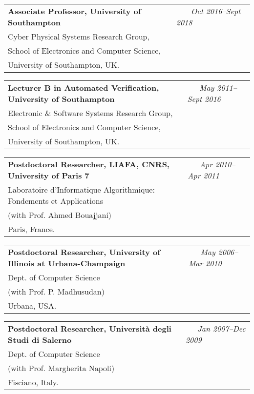\begin{resume}
\begin{tabular}{@{}p{4.6in}p{1.8in}}
{\bf Associate Professor, University of Southampton } & \emph{~~~ Oct 2016--Sept 2018}  \\
Cyber Physical Systems Research Group,\\
School of Electronics and Computer Science, \\
University of Southampton, UK.~\\
\end{tabular}


\begin{tabular}{@{}p{4.6in}p{1.8in}}
{\bf Lecturer B in Automated Verification, University of Southampton } & \emph{~~~May 2011--Sept 2016}  \\
Electronic \& Software Systems Research Group,\\
School of Electronics and Computer Science, \\
University of Southampton, UK.~\\
\end{tabular}


\begin{tabular}{@{}p{4.6in}p{1.8in}}
{\bf Postdoctoral Researcher, LIAFA, CNRS, University of Paris 7 } & \emph{~~~Apr 2010--Apr 2011}  \\
Laboratoire d'Informatique Algorithmique: Fondements et Applications &~\\
(with Prof. Ahmed Bouajjani) ~\\
Paris, France.~\\
\end{tabular}



\begin{tabular}{@{}p{4.6in}p{1.8in}}
{\bf Postdoctoral Researcher, University of
Illinois at Urbana-Champaign} & \emph{~~~May 2006--Mar 2010}  \\
Dept. of Computer Science &~\\
(with Prof. P. Madhusudan) ~\\
Urbana, USA.~\\
\end{tabular}



\begin{tabular}{@{}p{4.6in}p{1.8in}}
{\bf Postdoctoral  Researcher, Universit\`a degli Studi di Salerno} & \emph{~~~Jan 2007--Dec 2009}  \\
Dept. of Computer Science &~\\
(with Prof. Margherita Napoli) ~\\
Fisciano, Italy.~\\
\end{tabular}


\end{resume}

